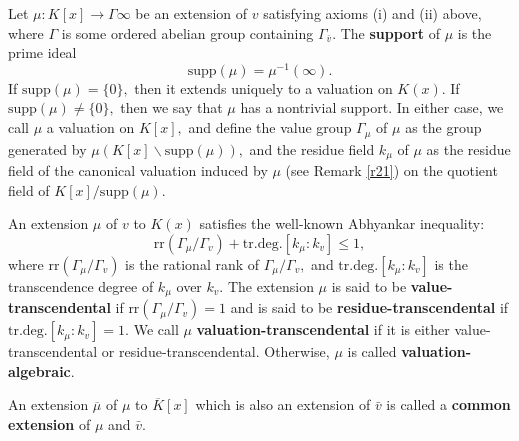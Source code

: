 \documentclass[11pt]{amsart}
\theoremstyle{definition}
\theoremstyle{remark}
\numberwithin{equation}{section}
\begin{document}
 Let $\mu:K[x]\longrightarrow\Gamma\infty$ be an extension of $v$ satisfying axioms (i) and (ii) above, where $\Gamma$ is some ordered abelian group containing $\Gamma_{\bar{v}}.$ The {\bf support}  of $\mu$ is the prime ideal
 \[\text{supp}(\mu)=\mu^{-1}(\infty).\] If $\text{supp}(\mu)=\{0\},$ then it extends uniquely to a valuation on $K(x).$ If $\text{supp}(\mu)\neq\{0\},$ then we say that $\mu$ has a nontrivial support. In either case, we call $\mu$ a valuation on $K[x],$ and define the value group $\Gamma_\mu$ of $\mu$ as the group generated by $\mu(K[x]\backslash\text{supp}(\mu)),$ and the residue field $k_\mu$ of $\mu$ as the residue field of the canonical valuation induced by $\mu$ (see Remark \ref{r21}) on the quotient field of $K[x]/\text{supp}(\mu)$.

 An extension $\mu$ of $v$ to $K(x)$ satisfies the well-known Abhyankar inequality: \[\text{rr}(\Gamma_\mu / \Gamma_v) + \text{tr.deg.}[k_{\mu}: k_v] \leq 1,\] where $\text{rr}(\Gamma_\mu / \Gamma_v )$ is the rational rank of $\Gamma_\mu / \Gamma_ v,$ and $\text{tr.deg.}[k_{\mu}: k_v]$ is the transcendence degree of $k_{\mu}$ over $k_v.$ The extension $\mu$ is said to be {\bf value-transcendental} if $\text{rr}(\Gamma_\mu / \Gamma_v)=1$ and is said to be {\bf residue-transcendental} if $\text{tr.deg.}[k_{\mu}: k_v]=1$. We call $\mu$ {\bf valuation-transcendental} if it is either value-transcendental or residue-transcendental. Otherwise, $\mu$ is called {\bf valuation-algebraic}.

An extension $\overline{\mu}$ of $\mu$ to $\overline{K}[x]$ which is also an extension of $\bar{v}$ is called a {\bf common extension} of $\mu$ and $\bar{v}$. 
\end{document}
